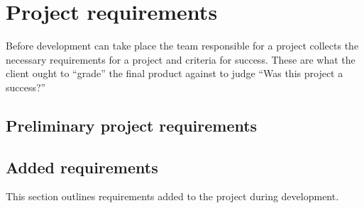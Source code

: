 \section{Project requirements}

Before development can take place the team responsible for a project collects the necessary requirements for a project and criteria for success.
These are what the client ought to ``grade'' the final product against to judge ``Was this project a success?''

\subsection{Preliminary project requirements}







%

\subsection{Added requirements}

This section outlines requirements added to the project during development.

